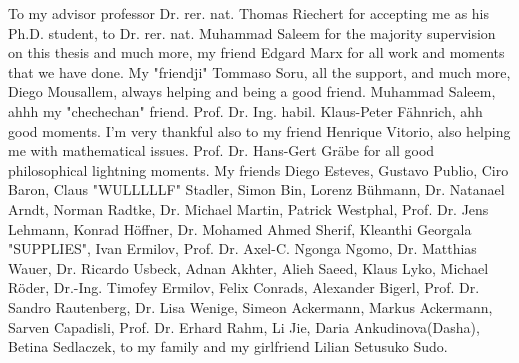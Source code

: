 To my advisor professor Dr. rer. nat. Thomas Riechert for accepting me as his Ph.D. student, to Dr. rer. nat. Muhammad Saleem for the majority supervision on this thesis and much more, my friend Edgard Marx for all work and moments that we have done. My "friendji" Tommaso Soru, all the support, and much more, Diego Mousallem, always helping and being a good friend. Muhammad Saleem, ahhh my "chechechan" friend. Prof. Dr. Ing. habil. Klaus-Peter Fähnrich, ahh good moments. I'm very thankful also to my friend Henrique Vitorio, also helping me with mathematical issues. Prof. Dr. Hans-Gert Gräbe for all good philosophical lightning moments. My friends Diego Esteves, Gustavo Publio, Ciro Baron, Claus "WULLLLLF" Stadler, Simon Bin, Lorenz Bühmann, Dr. Natanael Arndt, Norman Radtke, Dr. Michael Martin, Patrick Westphal, Prof. Dr. Jens Lehmann, Konrad Höffner, Dr. Mohamed Ahmed Sherif, Kleanthi Georgala "SUPPLIES", Ivan Ermilov, Prof. Dr. Axel-C. Ngonga Ngomo, Dr. Matthias Wauer, Dr. Ricardo Usbeck, Adnan Akhter, Alieh Saeed, Klaus Lyko, Michael Röder, Dr.-Ing. Timofey Ermilov, Felix Conrads, Alexander Bigerl, Prof. Dr. Sandro Rautenberg, Dr. Lisa Wenige, Simeon Ackermann, Markus Ackermann, Sarven Capadisli, Prof. Dr. Erhard Rahm, Li Jie, Daria Ankudinova(Dasha), Betina Sedlaczek, to my family and my girlfriend Lilian Setusuko Sudo.